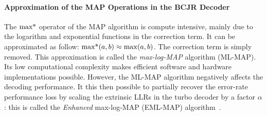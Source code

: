 

\paragraph{Approximation of the MAP Operations in the BCJR Decoder}


The $\operatorname*{max*}$ operator of the MAP algorithm is compute intensive, mainly due to
the logarithm and exponential functions in the correction term. It can be
approximated as follow: $\operatorname*{max*}(a,b) \approx \max(a,b)$. The correction term
is simply removed. This approximation is called the \emph{max-log-MAP} algorithm
(ML-MAP). Its low computational complexity makes efficient software and hardware
implementations possible. However, the ML-MAP algorithm negatively affects the
decoding performance. It this then possible to partially recover the error-rate
performance loss by scaling the extrinsic LLRs in the turbo decoder by a factor
$\alpha$: this is called the \emph{Enhanced} max-log-MAP (EML-MAP)
algorithm~\cite{Vogt2000,Studer2011}.

